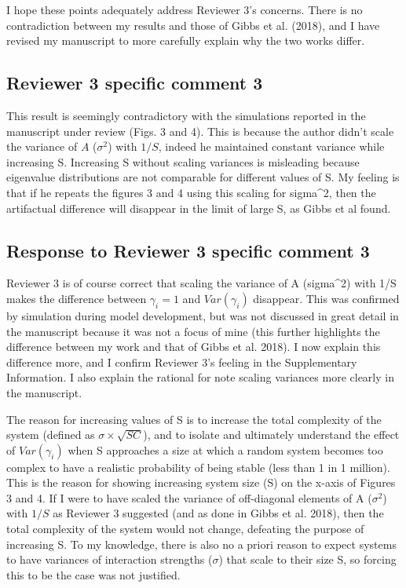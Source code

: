 \documentclass[]{article}
\begin{document}
I hope these points adequately address Reviewer 3's concerns. There is
no contradiction between my results and those of Gibbs et al. (2018),
and I have revised my manuscript to more carefully explain why the two
works differ.

\subsection{Reviewer 3 specific comment
3}\label{reviewer-3-specific-comment-3}

This result is seemingly contradictory with the simulations reported in
the manuscript under review (Figs. 3 and 4). This is because the author
didn't scale the variance of \(A\) (\(\sigma^2\)) with \(1/S\), indeed
he maintained constant variance while increasing S. Increasing S without
scaling variances is misleading because eigenvalue distributions are not
comparable for different values of S. My feeling is that if he repeats
the figures 3 and 4 using this scaling for sigma\^{}2, then the
artifactual difference will disappear in the limit of large S, as Gibbs
et al found.

\subsection{Response to Reviewer 3 specific comment
3}\label{response-to-reviewer-3-specific-comment-3}

Reviewer 3 is of course correct that scaling the variance of A
(sigma\^{}2) with 1/S makes the difference between \(\gamma_{i} = 1\)
and \(Var(\gamma_{i})\) disappear. This was confirmed by simulation
during model development, but was not discussed in great detail in the
manuscript because it was not a focus of mine (this further highlights
the difference between my work and that of Gibbs et al. 2018). I now
explain this difference more, and I confirm Reviewer 3's feeling in the
Supplementary Information. I also explain the rational for note scaling
variances more clearly in the manuscript.

The reason for increasing values of S is to increase the total
complexity of the system (defined as \(\sigma \times \sqrt{SC}\)), and
to isolate and ultimately understand the effect of \(Var(\gamma_{i})\)
when S approaches a size at which a random system becomes too complex to
have a realistic probability of being stable (less than 1 in 1 million).
This is the reason for showing increasing system size (S) on the x-axis
of Figures 3 and 4. If I were to have scaled the variance of
off-diagonal elements of A (\(\sigma^{2}\)) with \(1/S\) as Reviewer 3
suggested (and as done in Gibbs et al. 2018), then the total complexity
of the system would not change, defeating the purpose of increasing S.
To my knowledge, there is also no a priori reason to expect systems to
have variances of interaction strengths (\(\sigma\)) that scale to their
size S, so forcing this to be the case was not justified.
\end{document}
